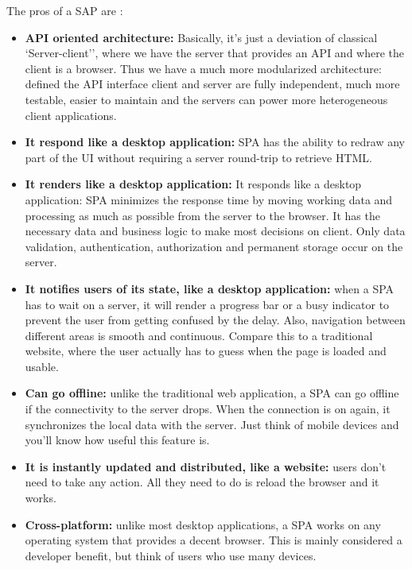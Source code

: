 \documentclass[a4paper,13pt]{report}
\begin{document}
The pros of a SAP are :
\begin{itemize}
    \item
        \textbf{API oriented architecture: } Basically, it's just a deviation of classical `Server-client'', where we have the server that provides an API and where the client is a browser. Thus we have a much more modularized architecture: defined the API interface client and server are fully independent, much more testable, easier to maintain and the servers can power more heterogeneous client applications.

    \item
    \textbf{It respond like a desktop application: } SPA has the ability to redraw any part of the UI without requiring a server round-trip to retrieve HTML.

    \item
    \textbf{It renders like a desktop application: }
    It responds like a desktop application: SPA minimizes the response time by moving working data and processing as much as possible from the server to the browser. It has the necessary data and business logic to make most decisions on client. Only data validation, authentication, authorization and permanent storage occur on the server.
    \item
    \textbf{It notifies users of its state, like a desktop application:  }
    when a SPA has to wait on a server, it will render a progress bar or a busy indicator to prevent the user from getting confused by the delay. Also, navigation between different areas is smooth and continuous. Compare this to a traditional website, where the user actually has to guess when the page is loaded and usable.
    \item
    \textbf{Can go offline: }
     unlike the traditional web application, a SPA can go offline if the connectivity to the server drops. When the connection is on again, it synchronizes the local data with the server. Just think of mobile devices and you'll know how useful this feature is.
    \item
    \textbf{It is instantly updated and distributed, like a website: }
     users don't need to take any action. All they need to do is reload the browser and it works.
    \item
    \textbf{Cross-platform: }
     unlike most desktop applications, a SPA works on any operating system that provides a decent browser. This is mainly considered a developer benefit, but think of users who use many devices.
\end{itemize}
\end{document}

